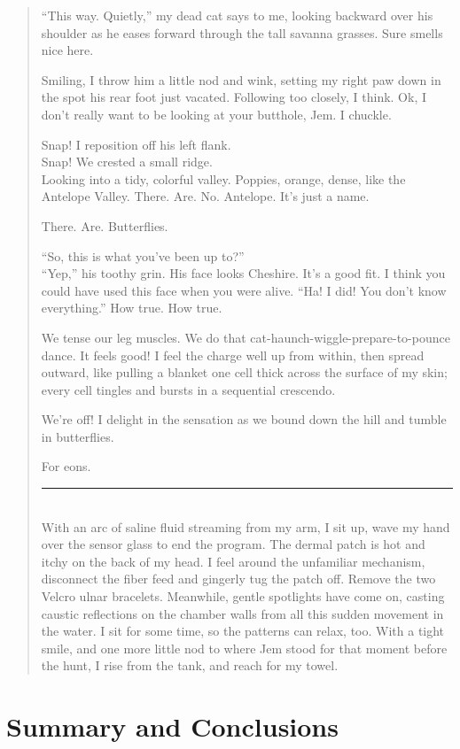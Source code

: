 \documentclass{UIdahoMastersThesis}
\begin{document}
\begin{quote}
{``This way. Quietly,'' my dead cat says to me, looking backward over his shoulder as he eases forward through the tall savanna grasses. Sure smells nice here.

Smiling, I throw him a little nod and wink, setting my right paw down in the spot his rear foot just vacated. Following too closely, I think. Ok, I don't really want to be looking at your butthole, Jem. I chuckle.

Snap! I reposition off his left flank.\\
Snap! We crested a small ridge.\\

Looking into a tidy, colorful valley. Poppies, orange, dense, like the Antelope Valley. There. Are. No. Antelope. It's just a name.

There. Are. Butterflies.

``So, this is what you've been up to?''\\
``Yep,'' his toothy grin. His face looks Cheshire. It's a good fit. I think you could have used this face when you were alive. ``Ha! I did! You don't know everything.'' How true. How true.

We tense our leg muscles. We do that cat-haunch-wiggle-prepare-to-pounce dance. It feels good! I feel the charge well up from within, then spread outward, like pulling a blanket one cell thick across the surface of my skin; every cell tingles and bursts in a sequential crescendo.

We're off! I delight in the sensation as we bound down the hill and tumble in butterflies.

For eons. 

\noindent\rule{2cm}{0.4pt}\\
With an arc of saline fluid streaming from my arm, I sit up, wave my hand over the sensor glass to end the program. The dermal patch is hot and itchy on the back of my head. I feel around the unfamiliar mechanism, disconnect the fiber feed and gingerly tug the patch off. Remove the two Velcro ulnar bracelets. Meanwhile, gentle spotlights have come on, casting caustic reflections on the chamber walls from all this sudden movement in the water. I sit for some time, so the patterns can relax, too.
With a tight smile, and one more little nod to where Jem stood for that moment before the hunt, I rise from the tank, and reach for my towel.
}
\end{quote}
\chapter{Summary and Conclusions}
\label{Chapter:SummaryAndConclusions}
\end{document}
